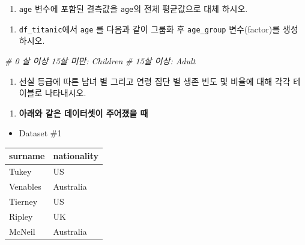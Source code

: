 \documentclass[
  11pt,
]{krantz}
\newenvironment{Shaded}{\begin{snugshade}}{\end{snugshade}}
\newcommand{\CommentTok}[1]{\textcolor[rgb]{0.37,0.37,0.37}{\textit{#1}}}
\providecommand{\tightlist}{%
  \setlength{\itemsep}{0pt}\setlength{\parskip}{0pt}}
\begin{document}
\begin{enumerate}
\def\labelenumi{\alph{enumi})}
\setcounter{enumi}{2}
\tightlist
\item
  \texttt{age} 변수에 포함된 결측값을 \texttt{age}의 전체 평균값으로 대체 하시오.
\end{enumerate}

\begin{enumerate}
\def\labelenumi{\alph{enumi})}
\setcounter{enumi}{3}
\tightlist
\item
  \texttt{df\_titanic}에서 \texttt{age} 를 다음과 같이 그룹화 후 \texttt{age\_group} 변수(factor)를 생성 하시오.
\end{enumerate}

\footnotesize

\begin{Shaded}
\begin{Highlighting}[]
\CommentTok{# 0 살 이상 15살 미만: Children}
\CommentTok{# 15살 이상: Adult}
\end{Highlighting}
\end{Shaded}

\normalsize

\begin{enumerate}
\def\labelenumi{\alph{enumi})}
\setcounter{enumi}{4}
\tightlist
\item
  선실 등급에 따른 남녀 별 그리고 연령 집단 별 생존 빈도 및 비율에 대해 각각 테이블로 나타내시오.
\end{enumerate}

\begin{enumerate}
\def\labelenumi{\arabic{enumi}.}
\setcounter{enumi}{3}
\tightlist
\item
  \textbf{아래와 같은 데이터셋이 주어졌을 때 }
\end{enumerate}

\begin{itemize}
\tightlist
\item
  Dataset \#1
\end{itemize}

\footnotesize

\begin{tabular}{l|l}
\hline
surname & nationality\\
\hline
Tukey & US\\
\hline
Venables & Australia\\
\hline
Tierney & US\\
\hline
Ripley & UK\\
\hline
McNeil & Australia\\
\hline
\end{tabular}
\end{document}
